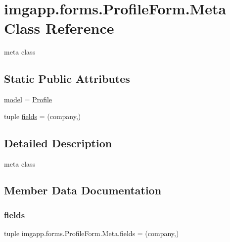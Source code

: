 \hypertarget{classimgapp_1_1forms_1_1ProfileForm_1_1Meta}{}\section{imgapp.\+forms.\+Profile\+Form.\+Meta Class Reference}
\label{classimgapp_1_1forms_1_1ProfileForm_1_1Meta}


meta class  


\subsection*{Static Public Attributes}
\begin{DoxyCompactItemize}
\item 
\hyperlink{classimgapp_1_1forms_1_1ProfileForm_1_1Meta_a1781be7cea589fabd63eec0d18cdd232}{model} = \hyperlink{classimgapp_1_1models_1_1Profile}{Profile}
\item 
tuple \hyperlink{classimgapp_1_1forms_1_1ProfileForm_1_1Meta_a30b0f2ddcde3a48b0df790c57432666e}{fields} = (\textquotesingle{}company\textquotesingle{},)
\end{DoxyCompactItemize}


\subsection{Detailed Description}
meta class 

\subsection{Member Data Documentation}
\mbox{\label{classimgapp_1_1forms_1_1ProfileForm_1_1Meta_a30b0f2ddcde3a48b0df790c57432666e}} 
\subsubsection{\texorpdfstring{fields}{fields}}
{\footnotesize\ttfamily tuple imgapp.\+forms.\+Profile\+Form.\+Meta.\+fields = (\textquotesingle{}company\textquotesingle{},)\hspace{0.3cm}{\ttfamily [static]}}

